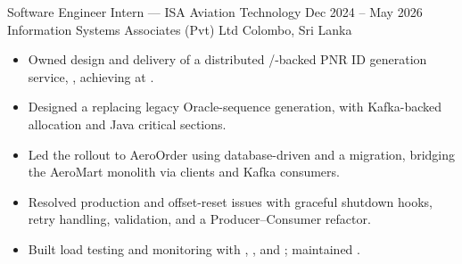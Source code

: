 \CVExperienceEntry
{Software Engineer Intern --- ISA Aviation Technology}
{Dec 2024 -- May 2026}
{Information Systems Associates (Pvt) Ltd}
{Colombo, Sri Lanka}

\begin{itemize}[leftmargin=*, itemsep=0.2em, topsep=0.1em]
  \item Owned design and delivery of a distributed /-backed PNR ID generation service, , achieving  at .
  \item Designed a  replacing legacy Oracle-sequence generation, with  Kafka-backed allocation and Java  critical sections.
  \item Led the rollout to AeroOrder using database-driven  and a  migration, bridging the  AeroMart monolith via  clients and Kafka consumers.
  \item Resolved production  and offset-reset issues with graceful shutdown hooks, retry handling, validation, and a Producer--Consumer refactor.
  \item Built load testing and monitoring with , , and ; maintained .
\end{itemize}
